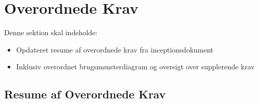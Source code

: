 \section{Overordnede Krav}
Denne sektion skal indeholde:

\begin{itemize}
    \item Opdateret resume af overordnede krav fra inceptionsdokument
    \item Inklusiv overordnet brugsmønsterdiagram og oversigt over supplerende krav
\end{itemize}{}

\subsection{Resume af Overordnede Krav}

